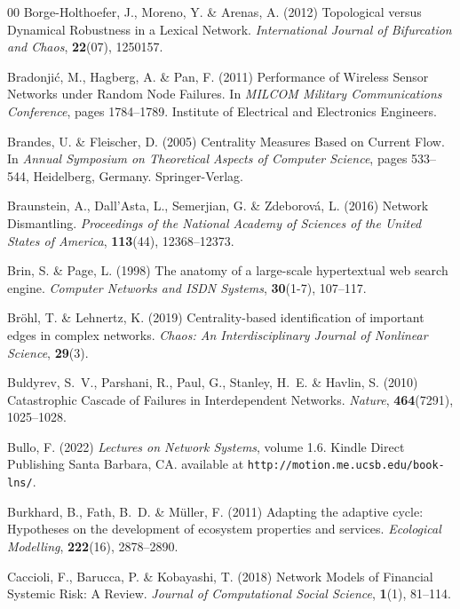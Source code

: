 \documentclass{comnet-mod}
\begin{document}
\begin{thebibliography}{00}
{Borge-Holthoefer}, J., Moreno, Y. {\&} Arenas, A. (2012)  {Topological versus
  Dynamical Robustness in a Lexical Network}. {\em {International Journal of
  Bifurcation and Chaos}}, \textbf{22}(07), 1250157.

Bradonji{\'c}, M., Hagberg, A. {\&} Pan, F. (2011)  {Performance of Wireless
  Sensor Networks under Random Node Failures}. In {\em {{{MILCOM}} Military
  Communications Conference}}, pages 1784--1789. {Institute of Electrical and
  Electronics Engineers}.

Brandes, U. {\&} Fleischer, D. (2005)  {Centrality Measures Based on Current
  Flow}. In {\em {Annual Symposium on Theoretical Aspects of Computer
  Science}}, pages 533--544, {Heidelberg, Germany}. {Springer-Verlag}.

Braunstein, A., Dall'Asta, L., Semerjian, G. {\&} Zdeborov{\'a}, L. (2016)
  {Network Dismantling}. {\em {Proceedings of the National Academy of Sciences
  of the United States of America}}, \textbf{113}(44), 12368--12373.

Brin, S. {\&} Page, L. (1998)  The anatomy of a large-scale hypertextual web
  search engine. {\em {Computer Networks and ISDN Systems}}, \textbf{30}(1-7),
  107--117.

Br{\"o}hl, T. {\&} Lehnertz, K. (2019)  Centrality-based identification of
  important edges in complex networks. {\em {Chaos: An Interdisciplinary
  Journal of Nonlinear Science}}, \textbf{29}(3).

Buldyrev, S.~V., Parshani, R., Paul, G., Stanley, H.~E. {\&} Havlin, S. (2010)
  {Catastrophic Cascade of Failures in Interdependent Networks}. {\em
  {Nature}}, \textbf{464}(7291), 1025--1028.

Bullo, F. (2022) {\em Lectures on Network Systems}, volume 1.6.
Kindle Direct Publishing Santa Barbara, CA.
available at {\tt http://motion.me.ucsb.edu/book-lns/}.

Burkhard, B., Fath, B.~D. {\&} M{\"u}ller, F. (2011)  {Adapting the adaptive
  cycle: Hypotheses on the development of ecosystem properties and services}.
  {\em {Ecological Modelling}}, \textbf{222}(16), 2878--2890.

Caccioli, F., Barucca, P. {\&} Kobayashi, T. (2018)  {Network Models of
  Financial Systemic Risk: {{A}} Review}. {\em {Journal of Computational Social
  Science}}, \textbf{1}(1), 81--114.


\end{thebibliography}
\end{document}

